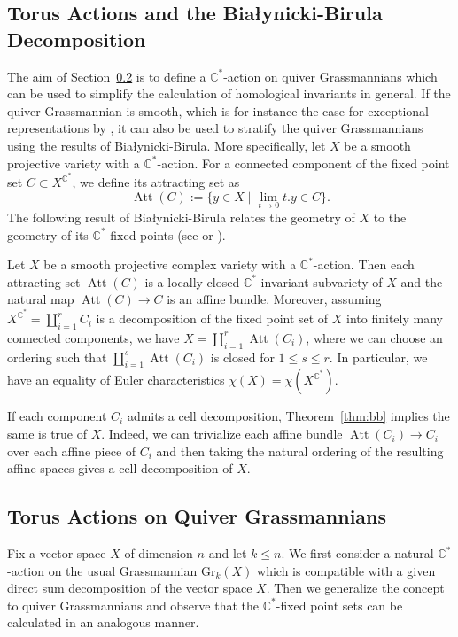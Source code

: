 \documentclass[smallextended,envcountsect,envcountsame]{svjour3}
\numberwithin{equation}{section}
\newcommand{\C}{\mathbb{C}}
\newcommand{\CC}{\mathbb{C}}
\newcommand{\Att}{\operatorname{Att}}
\newcommand{\Gr}{\mathrm{Gr}}
\begin{document}
\subsection{Torus Actions and the Bia\l{}ynicki-Birula Decomposition}
\label{sec:bb}

The aim of Section~\ref{torusaction} is to define a $\CC^*$-action on quiver Grassmannians which can be used to simplify the calculation of homological invariants in general.
If the quiver Grassmannian is smooth, which is for instance the case for exceptional representations by \cite{cr}, it can also be used to stratify the quiver Grassmannians using the results of Bia\l{}ynicki-Birula.
More specifically, let $X$ be a smooth projective variety with a $\C^\ast$-action.
For a connected component of the fixed point set $C\subset X^{\C^\ast}$, we define its attracting set as
\[\Att(C):=\{y\in X\mid \lim_{t\to 0}t.y\in C\}.\]
The following result of Bia\l{}ynicki-Birula relates the geometry of $X$ to the geometry of its $\CC^*$-fixed points (see \cite[Section 4]{bb} or \cite[Section 4]{ca}).
\begin{theorem}
  \label{thm:bb}
  Let $X$ be a smooth projective complex variety with a $\C^\ast$-action.
  Then each attracting set $\Att(C)$ is a locally closed $\CC^*$-invariant subvariety of $X$ and the natural map $\Att(C)\to C$ is an affine bundle.
  Moreover, assuming $X^{\C^\ast}=\coprod_{i=1}^r C_i$ is a decomposition of the fixed point set of $X$ into finitely many connected components, we have $X=\coprod_{i=1}^r \Att(C_i)$, where we can choose an ordering such that $\coprod_{i=1}^s\Att(C_i)$ is closed for $1\leq s\leq r$.
  In particular, we have an equality of Euler characteristics $\chi(X)=\chi(X^{\C^\ast})$.
\end{theorem}

If each component $C_i$ admits a cell decomposition, Theorem~\ref{thm:bb} implies the same is true of $X$.
Indeed, we can trivialize each affine bundle $\Att(C_i)\to C_i$ over each affine piece of $C_i$ and then taking the natural ordering of the resulting affine spaces gives a cell decomposition of $X$.


\subsection{Torus Actions on Quiver Grassmannians}
\label{torusaction}

Fix a vector space $X$ of dimension $n$ and let $k\leq n$.
We first consider a natural $\CC^*$-action on the usual Grassmannian $\Gr_k(X)$ which is compatible with a given direct sum decomposition of the vector space $X$.
Then we generalize the concept to quiver Grassmannians and observe that the $\CC^*$-fixed point sets can be calculated in an analogous manner.
\end{document}
